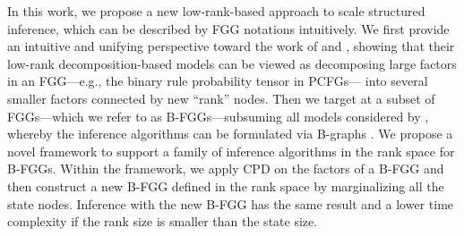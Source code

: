 \documentclass[11pt]{article}
\begin{document}
In this work, we propose a new low-rank-based approach to scale structured inference, which can be described by FGG notations intuitively.
We first provide an intuitive and unifying perspective toward the work of \citet{yang-etal-2021-pcfgs} and \citet{chiu2021low}, showing that their low-rank decomposition-based models can be viewed as decomposing large factors in an FGG---e.g., the binary rule probability tensor in PCFGs--- into several smaller factors connected by new ``rank'' nodes.  Then we target at a subset of FGGs---which we refer to as B-FGGs---subsuming all models considered by \citet{chiu2021low}, whereby the inference algorithms can be formulated via 
B-graphs \cite{DBLP:journals/dam/GalloLP93, DBLP:conf/iwpt/KleinM01}. We propose a novel framework to support a family of inference algorithms in the rank space for B-FGGs. Within the framework, we apply CPD on the factors of a B-FGG and then construct a new B-FGG defined in the rank space by marginalizing all the state nodes. Inference with the new B-FGG has the same result and a lower time complexity if the rank size is smaller than the state size.
\end{document}
